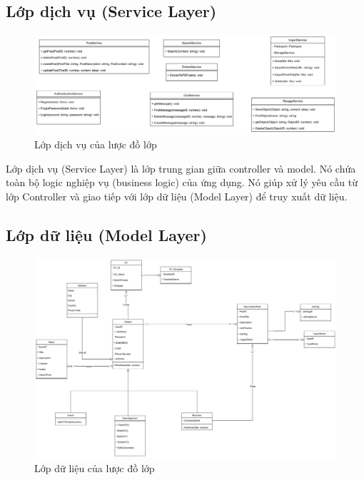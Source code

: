 \subsection{Lớp dịch vụ (Service Layer) }

\begin{figure}[H]

	\centering
    \includegraphics[scale=0.06]{img/Service_layer.png}
    \caption{Lớp dịch vụ của lược đồ lớp}
\end{figure}

Lớp dịch vụ (Service Layer) là lớp trung gian giữa controller và model. Nó chứa toàn bộ logic nghiệp vụ (business logic) của ứng dụng. Nó giúp xử lý yêu cầu từ lớp Controller và giao tiếp với lớp dữ liệu (Model Layer)  để truy xuất dữ liệu.


\subsection{Lớp dữ liệu (Model Layer)}

\begin{figure}[H]

	\centering
    \includegraphics[scale=0.07]{img/Overview_classDiagram.png}
    \caption{Lớp dữ liệu của lược đồ lớp}

	
\end{figure}

